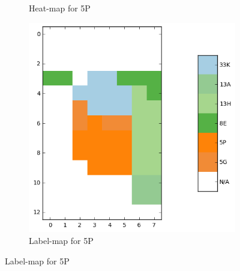 \begin{figure}
\begin{subfigure}[b]{0.3\textwidth}
\caption{Heat-map for 5P\label{fig:sample2_hm}}
\end{subfigure}
\begin{subfigure}[b]{0.3\textwidth}
\includegraphics[width=\textwidth]{img/sample2_labels.png}
\caption{Label-map for 5P\label{fig:sample2_lab}}
\end{subfigure}


\end{figure}
